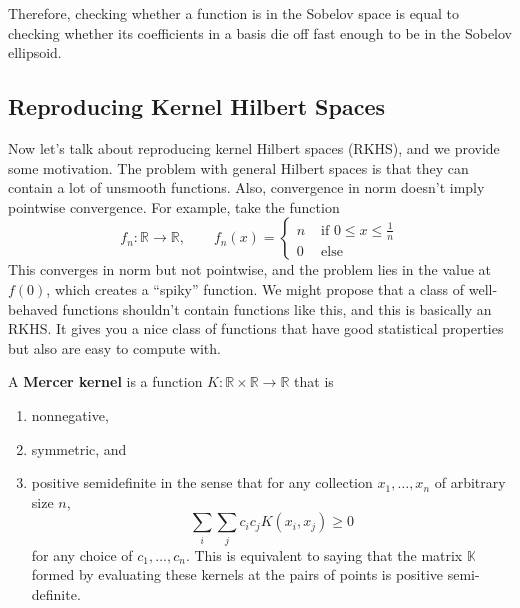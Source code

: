   Therefore, checking whether a function is in the Sobelov space is equal to checking whether its coefficients in a basis die off fast enough to be in the Sobelov ellipsoid. 

\subsection{Reproducing Kernel Hilbert Spaces}

  Now let's talk about reproducing kernel Hilbert spaces (RKHS), and we provide some motivation. The problem with general Hilbert spaces is that they can contain a lot of unsmooth functions. Also, convergence in norm doesn't imply pointwise convergence. For example, take the function 
  \begin{equation}
    f_n: \mathbb{R} \to \mathbb{R}, \qquad f_n (x) = \begin{cases}
      n & \text{ if } 0 \leq x \leq \frac{1}{n} \\ 
      0 & \text{ else }
    \end{cases}
  \end{equation}
  This converges in norm but not pointwise, and the problem lies in the value at $f(0)$, which creates a ``spiky'' function. We might propose that a class of well-behaved functions shouldn't contain functions like this, and this is basically an RKHS. It gives you a nice class of functions that have good statistical properties but also are easy to compute with. 

  \begin{definition}
    A \textbf{Mercer kernel} is a function $K: \mathbb{R} \times \mathbb{R} \rightarrow \mathbb{R}$ that is 
    \begin{enumerate}
      \item nonnegative, 
      \item symmetric, and 
      \item positive semidefinite in the sense that for any collection $x_1, \ldots, x_n$ of arbitrary size $n$, 
      \begin{equation}
        \sum_i \sum_j c_i c_j K(x_i, x_j) \geq 0 
      \end{equation}
      for any choice of $c_1, \ldots, c_n$. This is equivalent to saying that the matrix $\mathbb{K}$ formed by evaluating these kernels at the pairs of points is positive semi-definite. 
    \end{enumerate}
  \end{definition}


